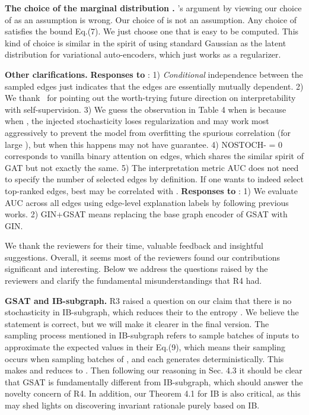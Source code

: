 \documentclass{article}
\begin{document}
\textbf{The choice of the marginal distribution .} \Rf's argument by viewing our choice of  as an assumption is wrong. Our choice of  is not an assumption. Any choice of  satisfies the bound Eq.(7). We just choose one that is easy to be computed. This kind of choice is similar in the spirit of using standard Gaussian as the latent distribution for variational auto-encoders, which just works as a regularizer.    

\textbf{Other clarifications.} 
\textbf{Responses to} \Rt: 1) \emph{Conditional} independence between the sampled edges just indicates that the edges are essentially mutually dependent. 2) We thank \Rt~for pointing out the worth-trying future direction on interpretability with self-supervision. 3) We guess the observation in Table 4 when  is because when , the injected stochasticity loses regularization and may work most aggressively to prevent the model from overfitting the spurious correlation (for large ), but when this happens may not have guarantee. 4) NOSTOCH- = 0 corresponds to vanilla binary attention on edges, which shares the similar spirit of GAT but not exactly the same.
5) The interpretation metric AUC does not need to specify the number of selected edges by definition. If one wants to indeed select top-ranked  edges, best  may be correlated with . \textbf{Responses to} \Rv: 1) We evaluate AUC across all edges using edge-level explanation labels by following previous works.
2) GIN+GSAT means replacing the base graph encoder of GSAT with GIN.















\newpage
We thank the reviewers for their time, valuable feedback and insightful suggestions. Overall, it seems most of the reviewers found our contributions significant and interesting. Below we address the questions raised by the reviewers and clarify the fundamental misunderstandings that R4 had.

\textbf{GSAT and IB-subgraph.} R3 raised a question on our claim that there is no stochasticity in IB-subgraph, which reduces their  to the entropy . We believe the statement is correct, but we will make it clearer in the final version. The sampling process mentioned in IB-subgraph refers to sample batches of inputs to approximate the expected values in their Eq.(9), which means their sampling occurs when sampling batches of , and each  generates  deterministically. This makes  and reduces  to . Then following our reasoning in Sec. 4.3 it should be clear that GSAT is fundamentally different from IB-subgraph, which should answer the novelty concern of R4. In addition, our Theorem 4.1 for IB is also critical, as this may shed lights on discovering invariant rationale purely based on IB.
\end{document}

